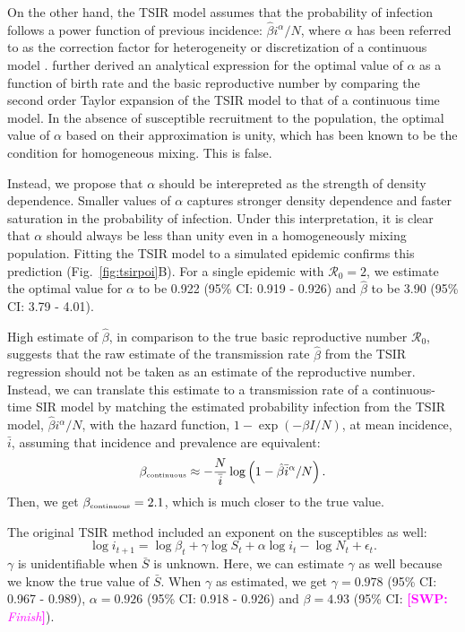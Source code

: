 \documentclass{article}
\newcommand{\fref}[1]{Fig.~\ref{fig:#1}}
\newcommand{\comment}[3]{\textcolor{#1}{\textbf{[#2: }\textsl{#3}\textbf{]}}}
\newcommand{\swp}[1]{\comment{magenta}{SWP}{#1}}
\newcommand{\tsub}[2]{#1_{{\textrm{\tiny #2}}}}
\begin{document}
On the other hand, the TSIR model assumes that the probability of infection follows a power function of previous incidence: $\hat{\beta} i^\alpha/N$, where $\alpha$ has been referred to as the correction factor for heterogeneity or discretization of a continuous model \citep{glass2003interpreting}.
\cite{glass2003interpreting} further derived an analytical expression for the optimal value of $\alpha$ as a function of birth rate and the basic reproductive number by comparing the second order Taylor expansion of the TSIR model to that of a continuous time model.
In the absence of susceptible recruitment to the population, the optimal value of $\alpha$ based on their approximation is unity, which has been known to be the condition for homogeneous mixing.
This is false.

Instead, we propose that $\alpha$ should be interepreted as the strength of density dependence.
Smaller values of $\alpha$ captures stronger density dependence and faster saturation in the probability of infection.	
Under this interpretation, it is clear that $\alpha$ should always be less than unity even in a homogeneously mixing population.
Fitting the TSIR model to a simulated epidemic confirms this prediction (\fref{tsirpoi}B).
For a single epidemic with $\mathcal R_0 = 2$, we estimate the optimal value for $\alpha$ to be 0.922 (95\% CI: 0.919 - 0.926) and $\hat{\beta}$ to be 3.90 (95\% CI: 3.79 - 4.01).

High estimate of $\hat{\beta}$, in comparison to the true basic reproductive number $\mathcal R_0$, suggests that the raw estimate of the transmission rate $\hat{\beta}$ from the TSIR regression should not be taken as an estimate of the reproductive number.
Instead, we can translate this estimate to a transmission rate of a continuous-time SIR model by matching the estimated probability infection from the TSIR model, $\hat{\beta} i^\alpha/N$, with the hazard function, $1 - \exp(-\beta I/N)$, at mean incidence, $\bar{i}$, assuming that incidence and prevalence are equivalent:
\begin{equation}
\tsub{\beta}{continuous} \approx - \frac{N}{\bar{i}} \log \left(1 - \hat{\beta} \bar{i}^\alpha/N \right).
\end{equation}
Then, we get $\tsub{\beta}{continuous} = 2.1$, which is much closer to the true value.

The original TSIR method included an exponent on the susceptibles as well:
\begin{equation}
\log i_{t + 1} = \log \beta_t + \gamma \log S_t + \alpha \log i_t - \log N_t + \epsilon_t.
\end{equation}
$\gamma$ is unidentifiable when $\bar S$ is unknown.
Here, we can estimate $\gamma$ as well because we know the true value of $\bar S$.
When $\gamma$ as estimated, we get $\gamma = 0.978$ (95\% CI: 0.967 - 0.989), $\alpha = 0.926$ (95\% CI: 0.918 - 0.926) and $\beta = 4.93$ (95\% CI: \swp{Finish}).
\end{document}
